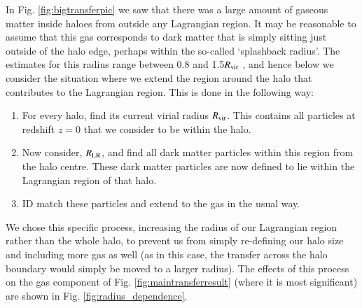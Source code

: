 In Fig. \ref{fig:bigtransferpic} we saw that there was a large amount of
gaseous matter inside haloes from outside any Lagrangian region. It may be
reasonable to assume that this gas corresponds to dark matter that is simply
sitting just outside of the halo edge, perhaps within the so-called
`splashback radius'. The estimates for this radius range between 0.8 and
1.5$R_{\rm vir}$ \citep{More2015, Diemer2017a}, and hence below we consider
the situation where we extend the region around the halo that contributes to
the Lagrangian region. This is done in the following way:
\begin{enumerate}
	\item For every halo, find its current virial radius $R_{\rm vir}$. This contains
	      all particles at redshift $z=0$ that we consider to be within the halo.
      \item Now consider, $R_{\rm LR}$, and find all dark matter particles within
            this region from the halo centre. These dark matter particles are now
            defined to lie within the Lagrangian region of that halo.
	\item ID match these particles and extend to the gas in the usual way.
\end{enumerate}
We chose this specific process, increasing the radius of our Lagrangian
region rather than the whole halo, to prevent us from simply re-defining our
halo size and including more gas as well (as in this case, the transfer
across the halo boundary would simply be moved to a larger radius). The
effects of this process on the gas component of Fig.
\ref{fig:maintransferresult} (where it is most significant) are shown in Fig.
\ref{fig:radius_dependence}.

